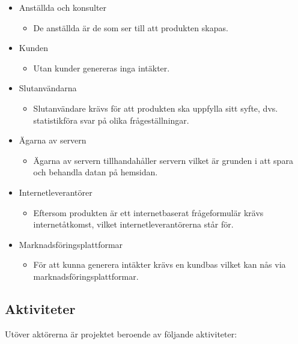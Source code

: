 \documentclass[12pt]{article}
\begin{document}
\begin{itemize}
    \item Anställda och konsulter
    \begin{itemize}
    \item De anställda är de som ser till att produkten skapas.
    \end{itemize}
    \item Kunden
    \begin{itemize}
    \item Utan kunder genereras inga intäkter.
    \end{itemize}
    \item Slutanvändarna
    \begin{itemize}
    \item Slutanvändare krävs för att produkten ska uppfylla sitt syfte, dvs. statistikföra svar på olika frågeställningar.
    \end{itemize}
    \item Ägarna av servern
    \begin{itemize}
    \item Ägarna av servern tillhandahåller servern vilket är grunden i att spara och behandla datan på hemsidan.
    \end{itemize}
    \item Internetleverantörer
    \begin{itemize}
        \item Eftersom produkten är ett internetbaserat frågeformulär krävs internetåtkomst, vilket internetleverantörerna står för.
    \end{itemize}
    \item Marknadsföringsplattformar
    \begin{itemize}
        \item För att kunna generera intäkter krävs en kundbas vilket kan nås via marknadsföringsplattformar.
    \end{itemize}
\end{itemize}
\newpage
\subsection{Aktiviteter}
Utöver aktörerna är projektet beroende av följande aktiviteter:
\end{document}
